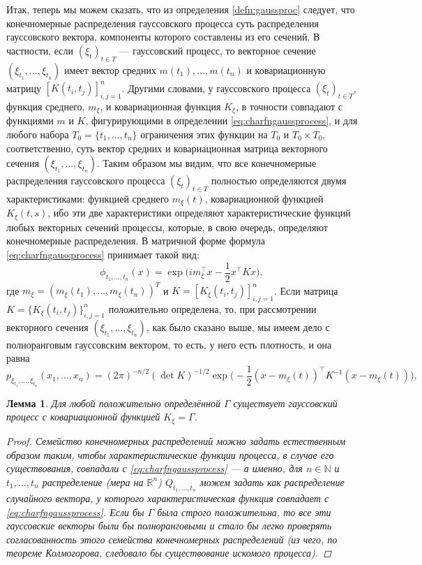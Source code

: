 \documentclass[10pt]{article}
\newtheorem{lemma}[thm]{Лемма}
\theoremstyle{boldnormal}
\newcommand{\N}{{\ensuremath{\mathbb{N}}}}
\newcommand{\R}{{\ensuremath{\mathbb{R}}}}
\theoremstyle{boldremark}
\newenvironment{remark}
  {\pushQED{\qed}\renewcommand{\qedsymbol}{$\diamond$}\rem}
  {\popQED\endrem}
\begin{document}
Итак, теперь мы можем сказать, что из 
определения \ref{defn:gaussproc} следует,
что конечномерные распределения гауссовского процесса
суть распределения гауссовского вектора,
компоненты которого составлены из его сечений. 
В частности, если \((\xi_t)_{t\in T}\) --- гауссовский 
процесс, то векторное сечение \((\xi_{t_1},\ldots,\xi_{t_n})\) 
имеет вектор средних \(m(t_1),\ldots,m(t_n)\) и 
ковариационную матрицу \([K(t_i,t_j)]_{i,j=1}^n\). 
Другими словами, у гауссовского процесса \((\xi_t)_{t\in T}\),
функция среднего, \(m_{\xi}\), и ковариационная функция
\(K_{\xi}\), в точности совпадают с функциями 
\(m\) и \(K\), фигурирующими в определении \eqref{eq:charfngaussprocess},
и для любого набора \(T_0=\{t_1,\ldots,t_n\}\) ограничения 
этих функции на \(T_0\) и \(T_0\times T_0\), соответственно,
суть вектор средних и ковариационная матрица векторного
сечения \((\xi_{t_1},\ldots,\xi_{t_n})\).
\begin{remark}\label{remark:gaussprocdetbychars}
Таким образом мы видим, что все 
 конечномерные распределения гауссовского процесса \((\xi_t)_{t\in T}\)
 полностью определяются двумя характеристиками: функцией среднего $m_\xi(t)$,
ковариационной функцией $K_\xi(t,s)$, ибо эти две характеристики
определяют характеристические функций любых векторных 
сечений процессы, которые,
в свою очередь, определяют конечномерные распределения.
\end{remark}
В матричной форме формула \eqref{eq:charfngaussprocess} принимает такой вид:
$$
\phi_{t_1,\ldots,t_n}({x}) = 
\exp\big( i {m}_\xi^\intercal  {x} - \frac{1}{2} {x}^\intercal K {x} \big),
$$ 
где ${m}_\xi = (m_\xi(t_1),\dots,m_\xi(t_n))^T$ и
$K = [K_\xi(t_i, t_j)]_{i,j=1}^n$.
Если матрица $K = \{K_\xi(t_i, t_j)\}_{i,j=1}^n$ положительно определена,
то, при рассмотрении векторного сечения 
\((\xi_{t_1},\ldots,\xi_{t_n})\), как было сказано выше, мы имеем дело
с полноранговым гауссовским вектором, то есть, у него есть плотность, 
и она равна
\[
p_{\xi_{t_1},\dots,\xi_{t_n}}(x_1,\dots,x_n) =
(2\pi)^{-n/2} (\det K)^{-1/2} 
\exp\big( -\frac{1}{2} ({x} - {m_\xi(t)})^\intercal K^{-1}({x}
 - {m_\xi(t)}) \big),
\]
\begin{lemma}\label{lemma:existencegaussproc}
Для любой положительно определённой $\Gamma$ существует
гауссовский процесс с ковариационной функцией $K_\xi = \Gamma$.
\begin{proof}
Семейство конечномерных распределений можно задать
естественным образом таким, чтобы характеристические функции 
процесса, в случае его существования, совпадали 
с \eqref{eq:charfngaussprocess} --- а именно, для 
\(n\in \N\) и \(t_1,\ldots,t_n\) 
распределение (мера на \(\R^n\)) \(Q_{t_1,\ldots,t_n}\) можем 
задать 
как распределение случайного вектора, у которого 
характеристическая функция совпадает с \eqref{eq:charfngaussprocess}.
Если бы \(\Gamma\) была строго положительна, то все 
эти гауссовские векторы были бы полноранговыми и стало бы легко 
проверять согласованность этого семейства конечномерных 
распределений (из чего, по теореме Колмогорова, следовало бы 
существование искомого процесса).
\end{proof}
\end{lemma}
\end{document}
